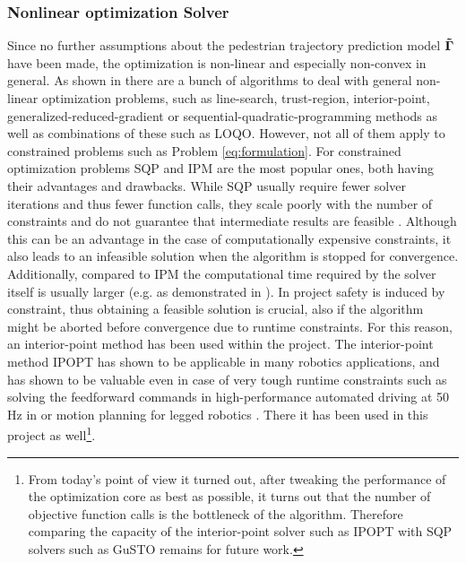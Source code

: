 \subsubsection{Nonlinear optimization Solver} 
Since no further assumptions about the pedestrian trajectory prediction model $\distmodel[]$ have been made, the optimization is non-linear and especially non-convex in general. As shown in \cite{Gould2003}\cite{Parkinson2018}\cite{Freund2004} there are a bunch of algorithms to deal with general non-linear optimization problems, such as line-search, trust-region, interior-point, generalized-reduced-gradient or sequential-quadratic-programming methods as well as combinations of these such as LOQO. However, not all of them apply to constrained problems such as Problem \ref{eq:formulation}. For constrained optimization problems \ac{SQP} and \ac{IPM} are the most popular ones, both having their advantages and drawbacks. While \ac{SQP} usually require fewer solver iterations and thus fewer function calls, they scale poorly with the number of constraints and do not guarantee that intermediate results are feasible \cite{Dehdari2013}\cite{Parkinson2018}. Although this can be an advantage in the case of computationally expensive constraints, it also leads to an infeasible solution when the algorithm is stopped for convergence. Additionally, compared to \ac{IPM} the computational time required by the solver itself is usually larger (e.g. as demonstrated in \cite{Dehdari2013}).
\newline
In project \project safety is induced by constraint, thus obtaining a feasible solution is crucial, also if the algorithm might be aborted before convergence due to runtime constraints. For this reason, an interior-point method has been used within the project. The interior-point method \ac{IPOPT} \cite{Wachter2006} has shown to be applicable in many robotics applications, and has shown to be valuable even in case of very tough runtime constraints such as solving the feedforward commands in high-performance automated driving at 50 Hz in \cite{Spielberge2019} or motion planning for legged robotics \cite{Winkler2018}. There it has been used in this project as well\footnote{From today's point of view it turned out, after tweaking the performance of the optimization core as best as possible, it turns out that the number of objective function calls is the bottleneck of the algorithm. Therefore comparing the capacity of the interior-point solver such as \ac{IPOPT} with \ac{SQP} solvers such as \ac{GuSTO} remains for future work.}.

